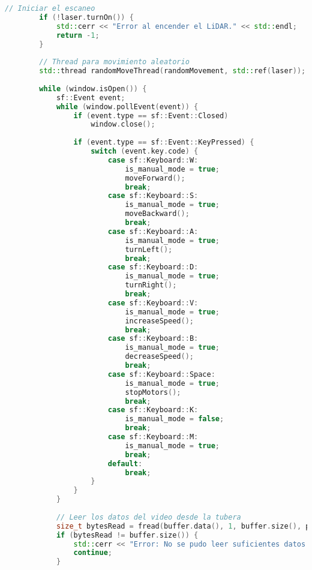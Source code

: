 \begin{lstlisting}[language={C++}, caption={Primer ajuste de c\'odigo}, label={PrimerAjuste}]
        // Iniciar el escaneo
        if (!laser.turnOn()) {
            std::cerr << "Error al encender el LiDAR." << std::endl;
            return -1;
        }
    
        // Thread para movimiento aleatorio
        std::thread randomMoveThread(randomMovement, std::ref(laser));
    
        while (window.isOpen()) {
            sf::Event event;
            while (window.pollEvent(event)) {
                if (event.type == sf::Event::Closed)
                    window.close();
    
                if (event.type == sf::Event::KeyPressed) {
                    switch (event.key.code) {
                        case sf::Keyboard::W:
                            is_manual_mode = true;
                            moveForward();
                            break;
                        case sf::Keyboard::S:
                            is_manual_mode = true;
                            moveBackward();
                            break;
                        case sf::Keyboard::A:
                            is_manual_mode = true;
                            turnLeft();
                            break;
                        case sf::Keyboard::D:
                            is_manual_mode = true;
                            turnRight();
                            break;
                        case sf::Keyboard::V:
                            is_manual_mode = true;
                            increaseSpeed();
                            break;
                        case sf::Keyboard::B:
                            is_manual_mode = true;
                            decreaseSpeed();
                            break;
                        case sf::Keyboard::Space:
                            is_manual_mode = true;
                            stopMotors();
                            break;
                        case sf::Keyboard::K:
                            is_manual_mode = false;
                            break;
                        case sf::Keyboard::M:
                            is_manual_mode = true;
                            break;
                        default:
                            break;
                    }
                }
            }
    
            // Leer los datos del video desde la tubera
            size_t bytesRead = fread(buffer.data(), 1, buffer.size(), pipe);
            if (bytesRead != buffer.size()) {
                std::cerr << "Error: No se pudo leer suficientes datos de video." << std::endl;
                continue;
            }
    

\end{lstlisting}
